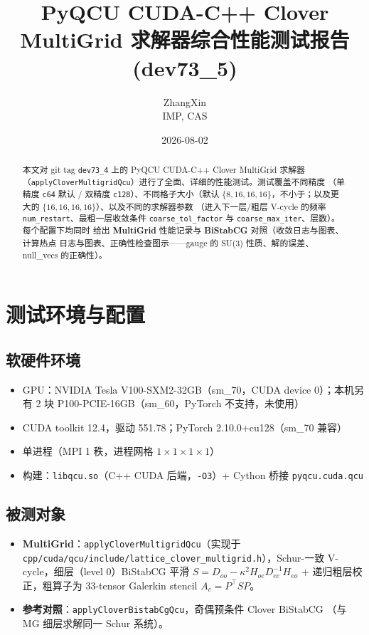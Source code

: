 \documentclass[11pt,a4paper]{article}
\title{\textbf{PyQCU CUDA-C++ Clover MultiGrid 求解器综合性能测试报告 (dev73\_5)}}
\author{ZhangXin \\ IMP, CAS}
\date{2026-08-02}
\begin{document}
\maketitle

\begin{abstract}
本文对 git tag \texttt{dev73\_4} 上的 PyQCU CUDA-C++ Clover MultiGrid 求解器
（\texttt{applyCloverMultigridQcu}）进行了全面、详细的性能测试。测试覆盖不同精度
（单精度 \texttt{c64} 默认 / 双精度 \texttt{c128}）、不同格子大小（默认
$\{8,16,16,16\}$，不小于；以及更大的 $\{16,16,16,16\}$）、以及不同的求解器参数
（进入下一层/粗层 V-cycle 的频率 \texttt{num\_restart}、最粗一层收敛条件
\texttt{coarse\_tol\_factor} 与 \texttt{coarse\_max\_iter}、层数）。每个配置下均同时
给出 \textbf{MultiGrid} 性能记录与 \textbf{BiStabCG} 对照（收敛日志与图表、计算热点
日志与图表、正确性检查图示——gauge 的 SU(3) 性质、解的误差、null\_vecs 的正确性）。
\end{abstract}

\tableofcontents

\section{测试环境与配置}
\label{sec:env}

\subsection{软硬件环境}
\begin{itemize}
  \item GPU：NVIDIA Tesla V100-SXM2-32GB（sm\_70，CUDA device 0）；本机另有 2 块
        P100-PCIE-16GB（sm\_60，PyTorch 不支持，未使用）
  \item CUDA toolkit 12.4，驱动 551.78；PyTorch 2.10.0+cu128（sm\_70 兼容）
  \item 单进程（MPI 1 秩，进程网格 $1\times1\times1\times1$）
  \item 构建：\texttt{libqcu.so}（C++ CUDA 后端，\texttt{-O3}）+
        Cython 桥接 \texttt{pyqcu.cuda.qcu}
\end{itemize}

\subsection{被测对象}
\begin{itemize}
  \item \textbf{MultiGrid}：\texttt{applyCloverMultigridQcu}（实现于
        \texttt{cpp/cuda/qcu/include/lattice\_clover\_multigrid.h}），Schur-一致
        V-cycle，细层（level 0）BiStabCG 平滑 $S=D_{oo}-\kappa^2 H_{oe}D_{ee}^{-1}H_{eo}$
        + 递归粗层校正，粗算子为 33-tensor Galerkin stencil $A_c=P^\top S P$。
  \item \textbf{参考对照}：\texttt{applyCloverBistabCgQcu}，奇偶预条件 Clover BiStabCG
        （与 MG 细层求解同一 Schur 系统）。
\end{itemize}
\end{document}
